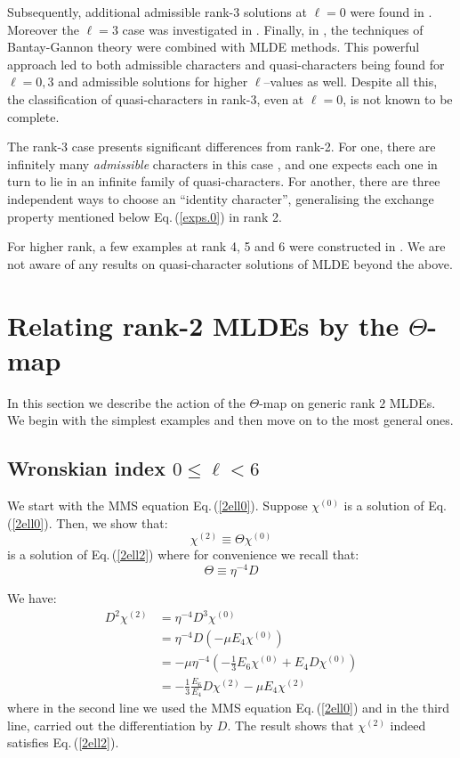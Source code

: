 \documentclass[11pt]{article}
\newcommand\be{\begin{equation}}
\newcommand\ee{\end{equation}}
\newcommand{\eref}[1]{Eq.\,(\ref{#1})}
\begin{document}
Subsequently, additional admissible rank-3 solutions at $\ell=0$ were found in \cite{Kaidi:2021ent, Das:2021uvd, Bae:2021mej}. Moreover the $\ell=3$ case was investigated in \cite{Gowdigere:2023xnm}. Finally, in \cite{Govindarajan:2025rgh, Govindarajan:2025jlq}, the techniques of Bantay-Gannon theory \cite{Bantay:2005vk, Bantay:2007zz} were combined with MLDE methods. This powerful approach led to both admissible characters and quasi-characters being found for $\ell=0,3$ and admissible solutions for higher $\ell$--values as well. Despite all this, the classification of quasi-characters in rank-3, even at $\ell=0$, is not known to be complete.

The rank-3 case presents significant differences from rank-2. For one, there are infinitely many {\em admissible} characters in this case \cite{Mathur:1988gt, Das:2021uvd}, and one expects each one in turn to lie in an infinite family of quasi-characters. For another, there are three independent ways to choose an ``identity character'', generalising the exchange property mentioned below \eref{exps.0} in rank 2.

For higher rank, a few examples at rank 4, 5 and 6 were constructed in \cite{Govindarajan:2025rgh}. We are not aware of any results on quasi-character solutions of MLDE beyond the above.

\section{Relating rank-2 MLDEs by the $\Theta$-map}

In this section we describe the action of the $\Theta$-map on generic rank $2$ MLDEs. We begin with the simplest examples and then move on to the most general ones.

\subsection{Wronskian index $0\le \ell < 6$}\label{sec:rk2}

We start with the MMS equation \eref{2ell0}. Suppose $\chi^{(0)}$ is a solution of \eref{2ell0}. Then, we show that:
\be\label{eq:rel_20-22}
\chi^{(2)} \equiv \Theta\chi^{(0)}
\ee
is a solution of \eref{2ell2} where for convenience we recall that:
\be
\Theta \equiv \eta^{-4} D
\ee

We have:
\begin{equation}
\begin{split}
D^2\chi^{(2)} & = \eta^{-4}D^3\chi^{(0)}\\
&= \eta^{-4}D(-\mu E_4\chi^{(0)})\\
&= -\mu\eta^{-4}\left(-\frac13 E_6\chi^{(0)}+E_4D\chi^{(0)}\right)\\
&=-\frac{1}{3}\frac{E_6}{E_4}D\chi^{(2)}-\mu E_4\chi^{(2)}
\end{split}
\end{equation}
where in the second line we used the MMS equation \eref{2ell0} and in the third line, carried out the differentiation by $D$. The result shows that $\chi^{(2)}$ indeed satisfies \eref{2ell2}. 
\end{document}
